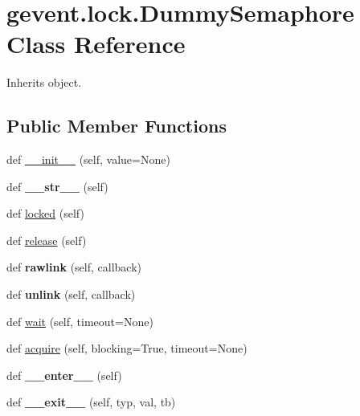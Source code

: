 \hypertarget{classgevent_1_1lock_1_1_dummy_semaphore}{}\section{gevent.\+lock.\+Dummy\+Semaphore Class Reference}
\label{classgevent_1_1lock_1_1_dummy_semaphore}


Inherits object.

\subsection*{Public Member Functions}
\begin{DoxyCompactItemize}
\item 
def \hyperlink{classgevent_1_1lock_1_1_dummy_semaphore_ab6c0219ecff8c5ac7aee4e5238841300}{\+\_\+\+\_\+init\+\_\+\+\_\+} (self, value=None)
\item 
\mbox{\label{classgevent_1_1lock_1_1_dummy_semaphore_af22b1956c0736406795d3292913b57d1}} 
def {\bfseries \+\_\+\+\_\+str\+\_\+\+\_\+} (self)
\item 
def \hyperlink{classgevent_1_1lock_1_1_dummy_semaphore_a32e9f4bb478d89bdc923aa32f334f88d}{locked} (self)
\item 
def \hyperlink{classgevent_1_1lock_1_1_dummy_semaphore_a29fb584a77690e528fc92764d990bf3d}{release} (self)
\item 
\mbox{\label{classgevent_1_1lock_1_1_dummy_semaphore_ac4b75a62cb5cded440af6cdcc0e0043c}} 
def {\bfseries rawlink} (self, callback)
\item 
\mbox{\label{classgevent_1_1lock_1_1_dummy_semaphore_a62e00ed09721be6bb6b10d4c3fc8566a}} 
def {\bfseries unlink} (self, callback)
\item 
def \hyperlink{classgevent_1_1lock_1_1_dummy_semaphore_a9c3fe3a91c10720b8eb75485ad9c9324}{wait} (self, timeout=None)
\item 
def \hyperlink{classgevent_1_1lock_1_1_dummy_semaphore_a2ec96f58e8df31411309513bb138dcc8}{acquire} (self, blocking=True, timeout=None)
\item 
\mbox{\label{classgevent_1_1lock_1_1_dummy_semaphore_a3e3e0aee9ddc3e13bf7d2dc78790b3d0}} 
def {\bfseries \+\_\+\+\_\+enter\+\_\+\+\_\+} (self)
\item 
\mbox{\label{classgevent_1_1lock_1_1_dummy_semaphore_a45bd391c0bf242191fe03420b9e06256}} 
def {\bfseries \+\_\+\+\_\+exit\+\_\+\+\_\+} (self, typ, val, tb)
\end{DoxyCompactItemize}


